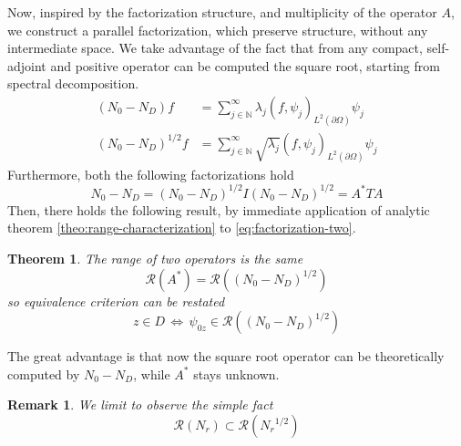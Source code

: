 \documentclass[10pt, a4paper, twoside, openright]{book}
\theoremstyle{definition}
\theoremstyle{plain}
\newtheorem{theorem}[subsection]{Theorem}
\theoremstyle{plain}
\theoremstyle{plain}
\theoremstyle{plain}
\newtheorem{remark}[subsection]{Remark}
\theoremstyle{plain}
\theoremstyle{plain}
\theoremstyle{plain}
\theoremstyle{plain}
\begin{document}
Now, inspired  by the factorization structure, and multiplicity of the operator $A$, we construct a parallel factorization, which preserve structure, without any intermediate space.
We take advantage of the fact that from any compact, self-adjoint and positive operator can be computed the square root, starting from spectral decomposition.
\begin{align}
({N_0} - {N_D}) f &= \sum_{j\in \mathbb{N}}^\infty \lambda_j(f,\psi_j)_{L^2(\partial\Omega)} \psi_j \\
({N_0} - {N_D})^{1/2} f &= \sum_{j\in \mathbb{N}}^\infty \sqrt{\lambda_j}(f,\psi_j)_{L^2(\partial\Omega)} \psi_j 
\end{align}
Furthermore, both the following factorizations hold
\begin{equation}
\label{eq:factorization-two}
 {N_0} - {N_D}=({N_0} - {N_D})^{1/2}I({N_0} - {N_D})^{1/2} = A^*TA
\end{equation}
Then, there holds the following result, by immediate application of analytic theorem \ref{theo:range-characterization} to \eqref{eq:factorization-two}.
\begin{theorem}
 The range of two operators is the same
 \begin{equation}
  \mathcal{R}(A^*) = \mathcal{R}(({N_0} - {N_D})^{1/2})
 \end{equation}
so equivalence criterion can be restated
 \begin{equation}
  z \in D \,\Longleftrightarrow \,\psi_{0z} \in \mathcal{R}(({N_0} - {N_D})^{1/2})  
 \end{equation}
\end{theorem}
The great advantage is that now the square root operator can be theoretically computed by ${N_0} - {N_D}$, while $A^*$ stays unknown.
\begin{remark}
 We limit to observe the simple fact
 \begin{equation}
  \mathcal{R}({N_r}) \subset \mathcal{R}({N_r}^{1/2})
 \end{equation}
\end{remark}
\end{document}
